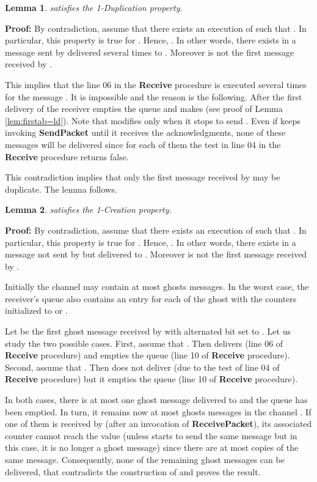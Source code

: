 \documentclass[11pt]{article}
\newtheorem{lemma}{Lemma}
\newenvironment{proof}{\noindent\textbf{Proof:}}{\hfill}
\begin{document}
\begin{lemma}\label{lem:duplication}
 satisfies the 1-Duplication property.
\end{lemma}

\begin{proof}
By contradiction, assume that there exists an execution  of  such that . In particular, this property is true for . Hence, . In other words, there exists in  a message  sent by  delivered several times to . Moreover  is not the first message received by .

This implies that the line 06 in the \textbf{Receive} procedure is executed several times for the message . It is impossible and the reason is the following. After the first delivery of  the receiver empties the queue and makes  (see proof of Lemma \ref{lem:firstab=ld}). Note that  modifies  only when it stops to send . Even if  keeps invoking \textbf{SendPacket}  until it receives the  acknowledgments, none of these messages will be delivered since for each of them the test in line 04 in the \textbf{Receive} procedure returns false.

This contradiction implies that only the first message received by  may be duplicate. The lemma follows. 
\end{proof}

\begin{lemma}\label{lem:creation}
 satisfies the 1-Creation property.
\end{lemma}

\begin{proof}
By contradiction, assume that there exists an execution  of  such that . In particular, this property is true for . Hence, . In other words, there exists in  a message  not sent by  but delivered to . Moreover  is not the first message received by .

Initially the channel  may contain at most  ghosts messages. In the worst case, the receiver's queue also contains an entry for each of the ghost with the counters initialized to  or .

Let  be the first ghost message received by  with alternated bit set to . Let us study the two possible cases. First, assume that . Then  delivers  (line 06 of \textbf{Receive} procedure) and empties the queue (line 10 of \textbf{Receive} procedure). Second, assume that . Then  does not deliver  (due to the test of line 04 of \textbf{Receive} procedure) but it empties the queue (line 10 of \textbf{Receive} procedure).

In both cases, there is at most one ghost message delivered to  and the queue has been emptied. In turn, it remains now at most  ghosts messages in the channel . If one of them is received by  (after an invocation of \textbf{ReceivePacket}), its associated counter cannot reach the value  (unless  starts to send the same message but in this case, it is no longer a ghost message) since there are at most  copies of the same message. Consequently, none of the  remaining ghost messages can be delivered, that contradicts the construction of  and proves the result.  
\end{proof}
\end{document}
